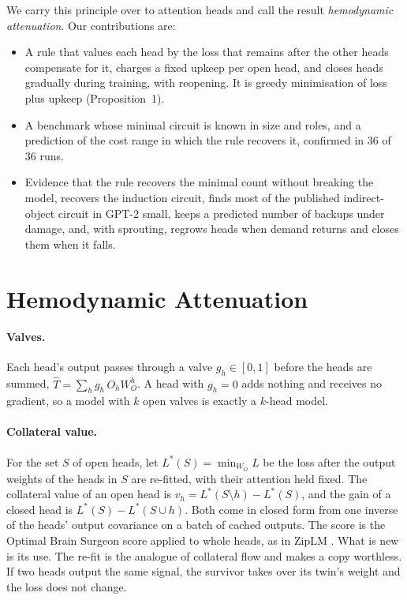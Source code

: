 \documentclass[letterpaper]{article} %
\begin{document}
We carry this principle over to attention heads and call the result \emph{hemodynamic attenuation}. Our contributions are:
\begin{itemize}
\item A rule that values each head by the loss that remains after the other heads compensate for it, charges a fixed upkeep per open head, and closes heads gradually during training, with reopening. It is greedy minimisation of loss plus upkeep (Proposition~1).
\item A benchmark whose minimal circuit is known in size and roles, and a prediction of the cost range in which the rule recovers it, confirmed in 36 of 36 runs.
\item Evidence that the rule recovers the minimal count without breaking the model, recovers the induction circuit, finds most of the published indirect-object circuit in GPT-2 small, keeps a predicted number of backups under damage, and, with sprouting, regrows heads when demand returns and closes them when it falls.
\end{itemize}

\section{Hemodynamic Attenuation}

\paragraph{Valves.} Each head's output passes through a valve $g_h\in[0,1]$ before the heads are summed, $\hat{T}=\sum_h g_h\, O_h W_O^h$. A head with $g_h=0$ adds nothing and receives no gradient, so a model with $k$ open valves is exactly a $k$-head model.

\paragraph{Collateral value.} For the set $S$ of open heads, let $L^\ast(S)=\min_{W_O} L$ be the loss after the output weights of the heads in $S$ are re-fitted, with their attention held fixed. The collateral value of an open head is $v_h=L^\ast(S\setminus h)-L^\ast(S)$, and the gain of a closed head is $L^\ast(S)-L^\ast(S\cup h)$. Both come in closed form from one inverse of the heads' output covariance on a batch of cached outputs. The score is the Optimal Brain Surgeon score \citep{obs} applied to whole heads, as in ZipLM \citep{ziplm}. What is new is its use. The re-fit is the analogue of collateral flow and makes a copy worthless. If two heads output the same signal, the survivor takes over its twin's weight and the loss does not change.
\end{document}
